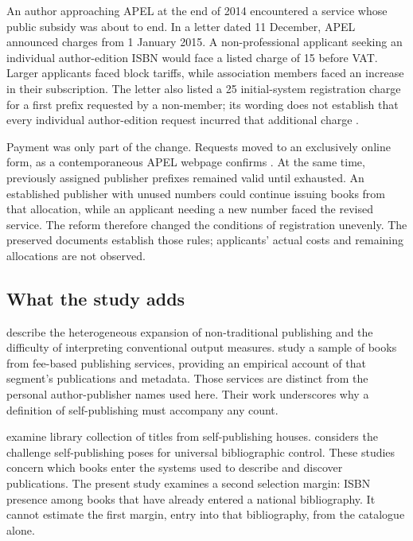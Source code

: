 \documentclass[11pt]{article}
\begin{document}
An author approaching APEL at the end of 2014 encountered a service whose public subsidy was about to end. In a letter dated 11 December, APEL announced charges from 1 January 2015. A non-professional applicant seeking an individual author-edition ISBN would face a listed charge of \texteuro{}15 before VAT. Larger applicants faced block tariffs, while association members faced an increase in their subscription. The letter also listed a \texteuro{}25 initial-system registration charge for a first prefix requested by a non-member; its wording does not establish that every individual author-edition request incurred that additional charge \citep{apel2014}.

Payment was only part of the change. Requests moved to an exclusively online form, as a contemporaneous APEL webpage confirms \citep{apel2015}. At the same time, previously assigned publisher prefixes remained valid until exhausted. An established publisher with unused numbers could continue issuing books from that allocation, while an applicant needing a new number faced the revised service. The reform therefore changed the conditions of registration unevenly. The preserved documents establish those rules; applicants' actual costs and remaining allocations are not observed.

\subsection{What the study adds}

\citet{bradley2011} describe the heterogeneous expansion of non-traditional publishing and the difficulty of interpreting conventional output measures. \citet{bradley2012} study a sample of books from fee-based publishing services, providing an empirical account of that segment's publications and metadata. Those services are distinct from the personal author-publisher names used here. Their work underscores why a definition of self-publishing must accompany any count.

\citet{dilevko2006} examine library collection of titles from self-publishing houses. \citet{holley2014} considers the challenge self-publishing poses for universal bibliographic control. These studies concern which books enter the systems used to describe and discover publications. The present study examines a second selection margin: ISBN presence among books that have already entered a national bibliography. It cannot estimate the first margin, entry into that bibliography, from the catalogue alone.
\end{document}
